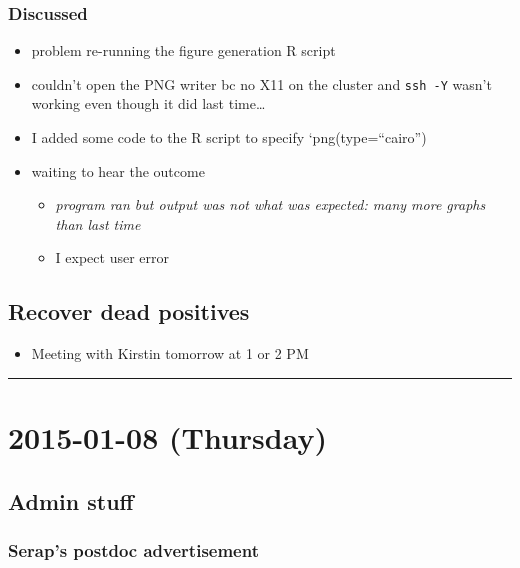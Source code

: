 \documentclass[letterpaper]{scrartcl}
\begin{document}
\subsubsection{Discussed}\label{discussed-1}

\begin{itemize}
\itemsep1pt\parskip0pt
\item
  problem re-running the figure generation R script
\item
  couldn't open the PNG writer bc no X11 on the cluster and
  \texttt{ssh -Y} wasn't working even though it did last time\ldots{}
\item
  I added some code to the R script to specify `png(type=``cairo'')
\item
  waiting to hear the outcome

  \begin{itemize}
  \itemsep1pt\parskip0pt
  \item
    \emph{program ran but output was not what was expected: many more
    graphs than last time}
  \item
    I expect user error
  \end{itemize}
\end{itemize}

\subsection{Recover dead positives}\label{recover-dead-positives-2}

\begin{itemize}
\itemsep1pt\parskip0pt
\item
  Meeting with Kirstin tomorrow at 1 or 2 PM
\end{itemize}

\begin{center}\rule{0.5\linewidth}{\linethickness}\end{center}

\section{2015-01-08 (Thursday)}\label{thursday}

\subsection{Admin stuff}\label{admin-stuff}

\subsubsection{Serap's postdoc
advertisement}\label{seraps-postdoc-advertisement}
\end{document}
